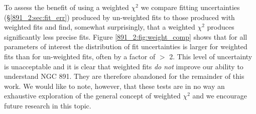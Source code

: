 
To assess the benefit of using a weighted $\chi^2$ we compare fitting
uncertainties (\S\ref{891_2:sec:fit_err}) produced by un-weighted fits to
those produced with weighted fits and find, somewhat surprisingly,
that a weighted $\chi^2$ produces significantly less precise fits.
Figure \ref{891_2:fig:weight_comp} shows that for all parameters of interest
the distribution of fit uncertainties is larger for weighted fits than
for un-weighted fits, often by a factor of $>$ 2. This level of
uncertainty is unacceptable and it is clear that weighted fits
\emph{do not} improve our ability to understand NGC 891. They are
therefore abandoned for the remainder of this work. We would like to
note, however, that these tests are in no way an exhaustive
exploration of the general concept of weighted $\chi^2$ and we
encourage future research in this topic.





